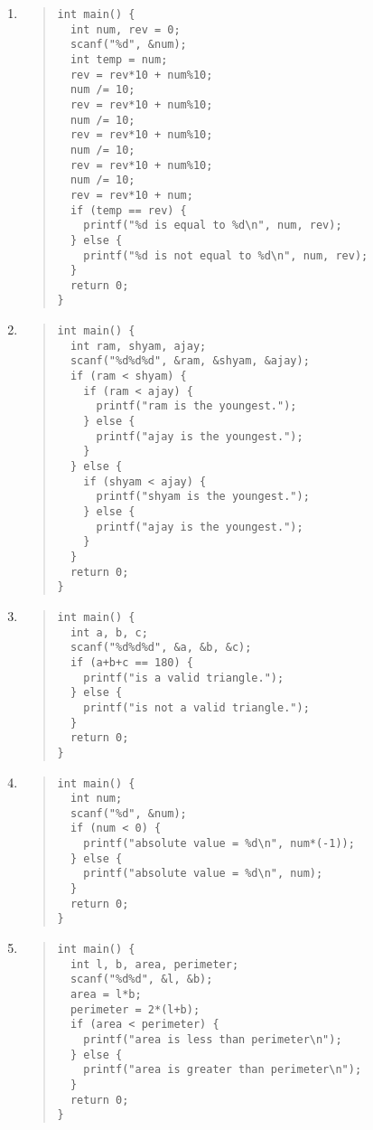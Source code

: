 \documentclass{report}
\begin{document}
\begin{enumerate}
  \item \begin{quote} \begin{verbatim}
int main() {
  int num, rev = 0;
  scanf("%d", &num);
  int temp = num;
  rev = rev*10 + num%10;
  num /= 10;
  rev = rev*10 + num%10;
  num /= 10;
  rev = rev*10 + num%10;
  num /= 10;
  rev = rev*10 + num%10;
  num /= 10;
  rev = rev*10 + num;
  if (temp == rev) {
    printf("%d is equal to %d\n", num, rev);
  } else {
    printf("%d is not equal to %d\n", num, rev);
  }
  return 0;
}
  \end{verbatim} \end{quote} 

  \item \begin{quote} \begin{verbatim}
int main() {
  int ram, shyam, ajay;
  scanf("%d%d%d", &ram, &shyam, &ajay);
  if (ram < shyam) {
    if (ram < ajay) {
      printf("ram is the youngest.");
    } else {
      printf("ajay is the youngest.");
    }
  } else {
    if (shyam < ajay) {
      printf("shyam is the youngest.");
    } else {
      printf("ajay is the youngest.");
    }
  }
  return 0;
}
  \end{verbatim} \end{quote} 

  \item \begin{quote} \begin{verbatim}
int main() {
  int a, b, c;
  scanf("%d%d%d", &a, &b, &c);
  if (a+b+c == 180) {
    printf("is a valid triangle.");
  } else {
    printf("is not a valid triangle.");
  }
  return 0;
}
  \end{verbatim} \end{quote} 

  \item \begin{quote} \begin{verbatim}
int main() {
  int num;
  scanf("%d", &num);
  if (num < 0) {
    printf("absolute value = %d\n", num*(-1));
  } else {
    printf("absolute value = %d\n", num);
  }
  return 0;
}
  \end{verbatim} \end{quote} 

  \item \begin{quote} \begin{verbatim}
int main() {
  int l, b, area, perimeter;
  scanf("%d%d", &l, &b);
  area = l*b;
  perimeter = 2*(l+b);
  if (area < perimeter) {
    printf("area is less than perimeter\n");
  } else {
    printf("area is greater than perimeter\n");
  }
  return 0;
}
  \end{verbatim} \end{quote} 


\end{enumerate}
\end{document}
